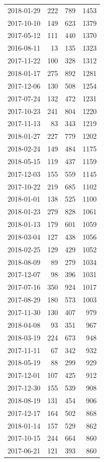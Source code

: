 \begin{tabular}{lrrr}
2018-01-29 & 222 & 789 & 1453 \\
2017-10-10 & 149 & 623 & 1379 \\
2017-05-12 & 111 & 440 & 1370 \\
2016-08-11 & 13 & 135 & 1323 \\
2017-11-22 & 100 & 328 & 1312 \\
2018-01-17 & 275 & 892 & 1281 \\
2017-12-06 & 130 & 508 & 1254 \\
2017-07-24 & 132 & 472 & 1231 \\
2017-10-23 & 241 & 804 & 1220 \\
2017-11-13 & 83 & 343 & 1219 \\
2018-01-27 & 227 & 779 & 1202 \\
2018-02-24 & 149 & 484 & 1175 \\
2018-05-15 & 119 & 437 & 1159 \\
2017-12-03 & 155 & 559 & 1145 \\
2017-10-22 & 219 & 685 & 1102 \\
2018-01-01 & 138 & 525 & 1100 \\
2018-01-23 & 279 & 828 & 1061 \\
2018-01-13 & 179 & 601 & 1059 \\
2018-03-04 & 127 & 438 & 1056 \\
2018-02-25 & 129 & 429 & 1052 \\
2018-08-09 & 89 & 279 & 1034 \\
2017-12-07 & 98 & 396 & 1031 \\
2017-07-16 & 350 & 924 & 1017 \\
2017-08-29 & 180 & 573 & 1003 \\
2017-11-30 & 130 & 407 & 979 \\
2018-04-08 & 93 & 351 & 967 \\
2018-03-19 & 224 & 673 & 948 \\
2017-11-11 & 67 & 342 & 932 \\
2018-05-19 & 88 & 299 & 929 \\
2017-12-01 & 107 & 425 & 912 \\
2017-12-30 & 155 & 539 & 908 \\
2018-08-19 & 131 & 454 & 906 \\
2017-12-17 & 164 & 502 & 868 \\
2018-01-14 & 157 & 529 & 862 \\
2017-10-15 & 244 & 664 & 860 \\
2017-06-21 & 121 & 393 & 860 \\

\end{tabular}
